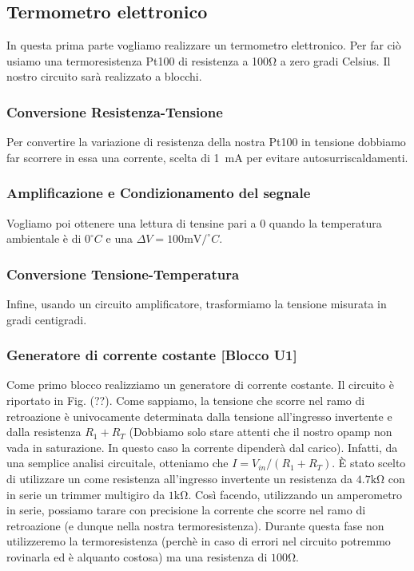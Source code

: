\subsection{Termometro elettronico}

In questa prima parte vogliamo realizzare un termometro elettronico. Per far ciò usiamo una termoresistenza Pt100 di resistenza a 100\si{\ohm} a zero gradi Celsius. Il nostro circuito sarà realizzato a blocchi.
\subsubsection*{Conversione Resistenza-Tensione}
Per convertire la variazione di resistenza della nostra Pt100 in tensione dobbiamo far scorrere in essa una corrente, scelta di \SI{1}{\milli\ampere} per evitare autosurriscaldamenti. 

\subsubsection*{Amplificazione e Condizionamento del segnale}
Vogliamo poi ottenere una lettura di tensine pari a 0 quando la temperatura ambientale è di $0^{\circ}C$ e una $\Delta V=100\si{\milli\volt}/^{\circ}C$.

\subsubsection*{Conversione Tensione-Temperatura}
Infine, usando un circuito amplificatore, trasformiamo la tensione misurata in gradi centigradi.


\subsubsection{Generatore di corrente costante [Blocco U1]}
Come primo blocco realizziamo un generatore di corrente costante. Il circuito è riportato in Fig. (??). Come sappiamo, la tensione che scorre nel ramo di retroazione è univocamente determinata dalla tensione all'ingresso invertente e dalla resistenza $R_1+R_T$ (Dobbiamo solo stare attenti che il nostro opamp non vada in saturazione. In questo caso la corrente dipenderà dal carico). Infatti, da una semplice analisi circuitale, otteniamo che $I=V_{in}/(R_1+R_T)$. È stato scelto di utilizzare un come resistenza all'ingresso invertente un resistenza da $4.7\si{\kilo\ohm}$ con in serie un trimmer multigiro da $1\si{\kilo\ohm}$. Così facendo, utilizzando un amperometro in serie, possiamo tarare con precisione la corrente che scorre nel ramo di retroazione (e dunque nella nostra termoresistenza). Durante questa fase non utilizzeremo la termoresistenza (perchè in caso di errori nel circuito potremmo rovinarla ed è alquanto costosa) ma una resistenza di $100\si{\ohm}$. 

